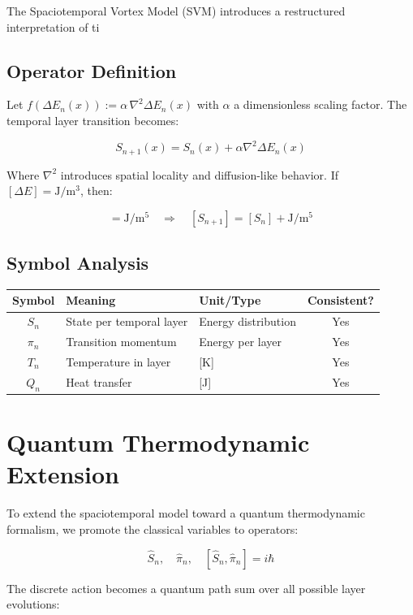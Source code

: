 \documentclass[11pt]{article}
\begin{document}
The Spaciotemporal Vortex Model (SVM) introduces a restructured interpretation of ti


\subsection*{Operator Definition}
Let $f(\Delta E_n(x)) := \alpha \, \nabla^2 \Delta E_n(x)$ with $\alpha$ a dimensionless scaling factor.
The temporal layer transition becomes:

\begin{equation*}
S_{n+1}(x) = S_n(x) + \alpha \nabla^2 \Delta E_n(x)
\end{equation*}

Where $\nabla^2$ introduces spatial locality and diffusion-like behavior. 
If $[\Delta E] = \mathrm{J/m^3}$, then:

\begin{equation*}
[f(\Delta E)] = \mathrm{J/m^5}
\quad \Rightarrow \quad [S_{n+1}] = [S_n] + \mathrm{J/m^5}
\end{equation*}

\subsection*{Symbol Analysis}
\begin{tabular}{|c|l|l|c|}
\hline
Symbol & Meaning & Unit/Type & Consistent? \\
\hline
$S_n$ & State per temporal layer & Energy distribution & Yes \\
$\pi_n$ & Transition momentum & Energy per layer & Yes \\
$T_n$ & Temperature in layer & [K] & Yes \\
$Q_n$ & Heat transfer & [J] & Yes \\
\hline
\end{tabular}


\section{Quantum Thermodynamic Extension}

To extend the spaciotemporal model toward a quantum thermodynamic formalism, we promote the classical variables to operators:

\begin{equation*}
\hat{S}_n, \quad \hat{\pi}_n, \quad [\hat{S}_n, \hat{\pi}_n] = i\hbar
\end{equation*}

The discrete action becomes a quantum path sum over all possible layer evolutions:
\end{document}
